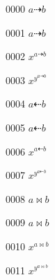 \documentclass{article}
\begin{document}
0000 $a\dashrightarrow b$\par
0001 $\displaystyle a\dashrightarrow b$\par
0002 $x^{a\dashrightarrow b}$\par
0003 $x^{y^{a\dashrightarrow b}}$\par
0004 $a\dashleftarrow b$\par
0005 $\displaystyle a\dashleftarrow b$\par
0006 $x^{a\dashleftarrow b}$\par
0007 $x^{y^{a\dashleftarrow b}}$\par
0008 $a\Join b$\par
0009 $\displaystyle a\Join b$\par
0010 $x^{a\Join b}$\par
0011 $x^{y^{a\Join b}}$\par
\end{document}

